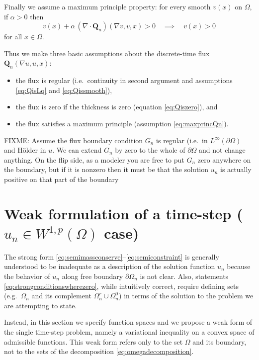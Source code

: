 \documentclass[final,leqno,onefignum,onetabnum]{siamltex1213bueler}
\newcommand\bQ{\mathbf{Q}}
\newcommand{\Div}{\nabla\cdot}
\renewcommand{\grad}{\nabla}
\begin{document}
Finally we assume a maximum principle property: for every smooth $v(x)$ on $\Omega$, if $\alpha>0$ then
\begin{equation}
v(x) + \alpha\, (\Div \bQ_n)(\grad v,v,x) > 0 \quad \implies \quad v(x) > 0 \label{eq:maxprincQn}
\end{equation}
for all $x\in\Omega$.

Thus we make three basic assumptions about the discrete-time flux $\bQ_n(\grad u,u,x)$: \begin{itemize}
\item the flux is regular (i.e.~continuity in second argument and assumptions \eqref{eq:QisLq} and \eqref{eq:Qissmooth}),
\item the flux is zero if the thickness is zero (equation \eqref{eq:Qiszero}), and
\item the flux satisfies a maximum principle (assumption \eqref{eq:maxprincQn}).
\end{itemize}

FIXME: Assume the flux boundary condition $G_n$ is regular (i.e.~in $L^\infty(\partial\Omega)$ and H\"older in $u$.  We can extend $G_n$ by zero to the whole of $\partial \Omega$ and not change anything.  On the flip side, as a modeler you are free to put $G_n$ zero anywhere on the boundary, but if it is nonzero then it must be that the solution $u_n$ is actually positive on that part of the boundary


\section{Weak formulation of a time-step ($u_n\in W^{1,p}(\Omega)$ case)}  \label{sec:weakform}

The strong form \eqref{eq:semimassconserve}--\eqref{eq:semiconstraint} is generally understood to be inadequate as a description of the solution function $u_n$ because the behavior of $u_n$ along free boundary $\partial\Omega_n$ is not clear.  Also, statements \eqref{eq:strongconditionswherezero}, while intuitively correct, require defining sets (e.g.~$\Omega_n$ and its complement $\Omega_n^r \cup \Omega_n^0$) in terms of the solution to the problem we are attempting to state.

Instead, in this section we specify function spaces and we propose a weak form of the single time-step problem, namely a variational inequality \cite{Friedman,KinderlehrerStampacchia} on a convex space of admissible functions.  This weak form refers only to the set $\Omega$ and its boundary, not to the sets of the decomposition \eqref{eq:omegadecomposition}.
\end{document}
